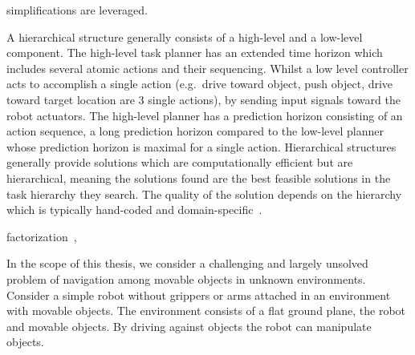 


simplifications are leveraged.







A hierarchical structure generally consists of a high-level and a low-level component. The high-level task planner has an extended time horizon which includes several atomic actions and their sequencing. Whilst a low level controller acts to accomplish a single action (e.g.~drive toward object, push object, drive toward target location are 3 single actions), by sending input signals toward the robot actuators. The high-level planner has a prediction horizon consisting of an action sequence, a long prediction horizon compared to the low-level planner whose prediction horizon is maximal for a single action. Hierarchical structures generally provide solutions which are computationally efficient but are hierarchical, meaning the solutions found are the best feasible solutions in the task hierarchy they search. The quality of the solution depends on the hierarchy which is typically hand-coded and domain-specific~\cite {vega-brown_asymptotically_2020}.

factorization~\cite{vega-brown_asymptotically_2020},


In the scope of this thesis, we consider a challenging and largely unsolved problem of navigation among movable objects in unknown environments. Consider a simple robot without grippers or arms attached in an environment with movable objects. The environment consists of a flat ground plane, the robot and movable objects. By driving against objects the robot can manipulate objects.\bs
{}






